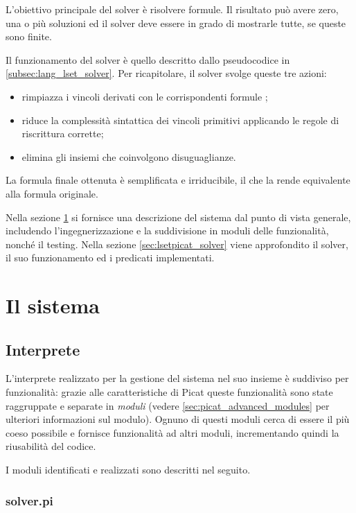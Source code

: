 \documentclass[12pt,a4paper,openright]{book} %
\begin{document}
\minitoc

L'obiettivo principale del solver \lset{} è risolvere formule. Il risultato può avere zero, una o più soluzioni ed il solver deve essere in grado di mostrarle tutte, se queste sono finite.

Il funzionamento del solver è quello descritto dallo pseudocodice in  \ref{subsec:lang_lset_solver}. Per ricapitolare, il solver svolge queste tre azioni:
\begin{itemize}
\item rimpiazza i vincoli derivati con le corrispondenti formule \lset{};
\item riduce la complessità sintattica dei vincoli primitivi applicando le regole di riscrittura corrette;
\item elimina gli insiemi che coinvolgono disuguaglianze.
\end{itemize} 
La formula finale ottenuta è semplificata e irriducibile, il che la rende equivalente alla formula originale.

Nella sezione \ref{sec:lsetpicat_system} si fornisce una descrizione del sistema dal punto di vista generale, includendo l'ingegnerizzazione e la suddivisione in moduli delle funzionalità, nonché il testing. Nella sezione \ref{sec:lsetpicat_solver} viene approfondito il solver, il suo funzionamento ed i predicati implementati.

\section{Il sistema}
\label{sec:lsetpicat_system}

\subsection{Interprete}
\label{sec:lsetpicat_system_interpreter}

L'interprete realizzato per la gestione del sistema nel suo insieme è suddiviso per funzionalità: grazie alle caratteristiche di Picat queste funzionalità sono state raggruppate e separate in \emph{moduli} (vedere \ref{sec:picat_advanced_modules} per ulteriori informazioni sul modulo). Ognuno di questi moduli cerca di essere il più coeso possibile e fornisce funzionalità ad altri moduli, incrementando quindi la riusabilità del codice.

I moduli identificati e realizzati sono descritti nel seguito.

\subsubsection{solver.pi}
\end{document}
